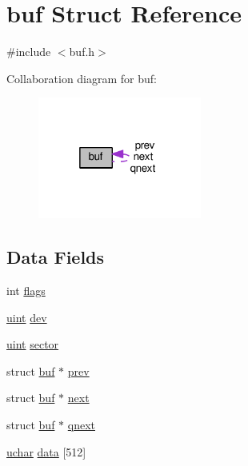 \hypertarget{structbuf}{\section{buf Struct Reference}
\label{structbuf}
}


{\ttfamily \#include $<$buf.\-h$>$}



Collaboration diagram for buf\-:
\nopagebreak
\begin{figure}[H]
\begin{center}
\leavevmode
\includegraphics[width=152pt]{structbuf__coll__graph}
\end{center}
\end{figure}
\subsection*{Data Fields}
\begin{DoxyCompactItemize}
\item 
int \hyperlink{structbuf_ac8bf36fe0577cba66bccda3a6f7e80a4}{flags}
\item 
\hyperlink{types_8h_a91ad9478d81a7aaf2593e8d9c3d06a14}{uint} \hyperlink{structbuf_aaf61a1db4c34c23857104abc633d8ee6}{dev}
\item 
\hyperlink{types_8h_a91ad9478d81a7aaf2593e8d9c3d06a14}{uint} \hyperlink{structbuf_ac4ea84582da27724e7735325dd490a92}{sector}
\item 
struct \hyperlink{structbuf}{buf} $\ast$ \hyperlink{structbuf_a48c008b4a22859e25eb05af3b5c22d45}{prev}
\item 
struct \hyperlink{structbuf}{buf} $\ast$ \hyperlink{structbuf_a5a609449f1b0b08ae96fe8b29e866fd7}{next}
\item 
struct \hyperlink{structbuf}{buf} $\ast$ \hyperlink{structbuf_a479532a4750e78d1ad819ef4121f6def}{qnext}
\item 
\hyperlink{types_8h_a65f85814a8290f9797005d3b28e7e5fc}{uchar} \hyperlink{structbuf_aa6cf955e5b0bdedd2b7d1461838a1134}{data} \mbox{[}512\mbox{]}
\end{DoxyCompactItemize}


